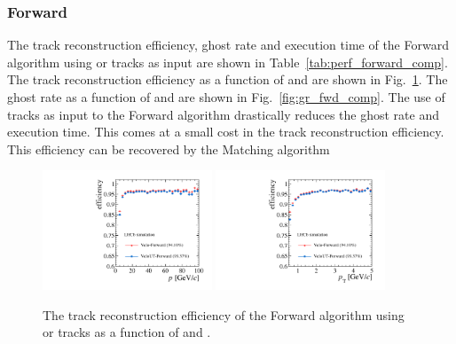 \subsubsection{Forward}

The track reconstruction efficiency, ghost rate and execution time of the Forward algorithm using \velo or \velout tracks as input are shown in Table~\ref{tab:perf_forward_comp}. The track reconstruction efficiency as a function of \ptot and \pt are shown in Fig.~\ref{fig:eff_fwd_comp}. The ghost rate as a function of \ptot and \pt are shown in Fig.~\ref{fig:gr_fwd_comp}. The use of \velout tracks as input to the Forward algorithm drastically reduces the ghost rate and execution time. This comes at a small cost in the track reconstruction efficiency. This efficiency can be recovered by the Matching algorithm 

\begin{table}[!tb]
\caption{The performances of the Forward algorithm using \velo or \velout tracks as input in terms of track reconstruction efficiency, ghost rate and execution time.}
 \label{tab:perf_forward_comp}
\end{table}

\begin{figure}[!tb]
\centering
\includegraphics[width=0.45\textwidth]{figs/upstream-tracking-upgrade/fwd_eff_p_comp.pdf}
\includegraphics[width=0.45\textwidth]{figs/upstream-tracking-upgrade/fwd_eff_pt_comp.pdf}
\caption{The track reconstruction efficiency of the Forward algorithm using \velo or \velout tracks as a function of \ptot and \pt.}
\label{fig:eff_fwd_comp}
\end{figure}

